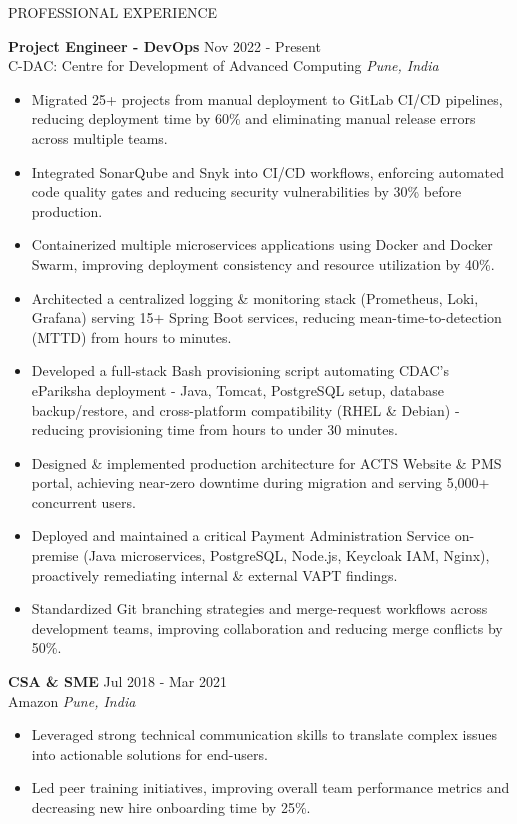\documentclass{resume} %
\begin{document}
\begin{rSection}{PROFESSIONAL EXPERIENCE}

\textbf{Project Engineer - DevOps} \hfill Nov 2022 - Present\\
C-DAC: Centre for Development of Advanced Computing \hfill \textit{Pune, India}
 \begin{itemize}
    \itemsep -3pt {} 
     \item Migrated 25+ projects from manual deployment to GitLab CI/CD pipelines, reducing deployment time by 60\% and eliminating manual release errors across multiple teams.
     \item Integrated SonarQube and Snyk into CI/CD workflows, enforcing automated code quality gates and reducing security vulnerabilities by 30\% before production.
     \item Containerized multiple microservices applications using Docker and Docker Swarm, improving deployment consistency and resource utilization by 40\%.
     \item Architected a centralized logging \& monitoring stack (Prometheus, Loki, Grafana) serving 15+ Spring Boot services, reducing mean-time-to-detection (MTTD) from hours to minutes.
     \item Developed a full-stack Bash provisioning script automating CDAC's ePariksha deployment - Java, Tomcat, PostgreSQL setup, database backup/restore, and cross-platform compatibility (RHEL \& Debian) - reducing provisioning time from hours to under 30 minutes.
     \item Designed \& implemented production architecture for ACTS Website \& PMS portal, achieving near-zero downtime during migration and serving 5,000+ concurrent users.
     \item Deployed and maintained a critical Payment Administration Service on-premise (Java microservices, PostgreSQL, Node.js, Keycloak IAM, Nginx), proactively remediating internal \& external VAPT findings.
     \item Standardized Git branching strategies and merge-request workflows across development teams, improving collaboration and reducing merge conflicts by 50\%.
 \end{itemize}
 
\textbf{CSA \& SME} \hfill Jul 2018 - Mar 2021\\
Amazon \hfill \textit{Pune, India}
 \begin{itemize}
    \itemsep -3pt {} 
     \item Leveraged strong technical communication skills to translate complex issues into actionable solutions for end-users.
     \item Led peer training initiatives, improving overall team performance metrics and decreasing new hire onboarding time by 25\%.
 \end{itemize}

\end{rSection} 
\end{document}
